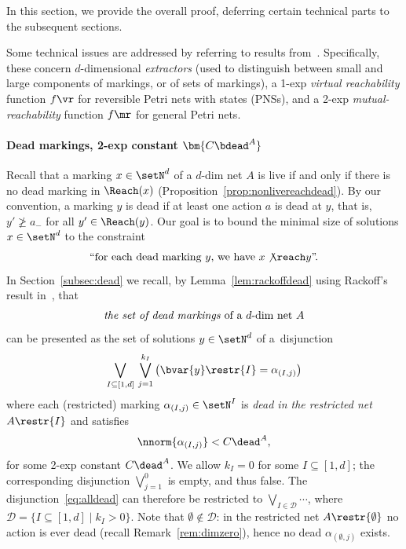 In this section, we provide the overall proof, deferring certain
technical parts 
to the subsequent sections.

\begin{rem}\label{rem:Lerresults}
Some technical issues are addressed by referring to results from~\cite{DBLP:conf/fsttcs/Leroux19}. Specifically, these concern
$d$-dimensional \emph{extractors} (used to distinguish between small
	and large components of markings, or of sets of markings),
a 1-exp \emph{virtual reachability} function $f\vr$ for reversible
	Petri nets with states (PNSs), and 
	a 2-exp \emph{mutual-reachability} function $f\mr$ for general
	Petri nets.
\end{rem}

\paragraph{Dead markings, 2-exp constant $\bm{C\bdead^A}$}
Recall that a marking $x\in\setN^d$ of a $d$-dim net $A$ is live if and only if there is no
dead marking in $\Reach(x)$
(Proposition~\ref{prop:nonlivereachdead}). By our convention, a
marking $y$ is dead if at least one action $a$ is dead at $y$, that
is, $y'\not\geq a_-$ for all $y'\in\Reach(y)$.
Our goal is to bound the minimal size of solutions $x\in\setN^d$ to the constraint
\begin{equation}\label{eq:firstconstr}
	\textnormal{``for each dead marking $y$, we have  $x\not\reach
	y$''.}
\end{equation}
In Section~\ref{subsec:dead} we recall, by
Lemma~\ref{lem:rackoffdead} using  Rackoff's
result in~\cite{DBLP:journals/tcs/Rackoff78}, that 
\begin{equation*}
	\textnormal{\emph{the set of dead markings} of a $d$-dim net
	$A$} 
\end{equation*}
	can be presented
as the set of solutions $y\in\setN^d$ 
of a~disjunction
\begin{equation}\label{eq:alldead}
	\bigvee_{I\subseteq [1,d]} \,\bigvee_{j=1}^{k_I}
	\left(\bvar{y}\restr{I}=\alpha_{(I,j)}\right)
\end{equation}
where 
each (restricted) marking $\alpha_{(I,j)}\in\setN^{I}$ is \emph{dead in the 
restricted net} $A\restr{I}$ and satisfies 
\[\nnorm{\alpha_{(I,j)}}< C\dead^A,\] for some 2-exp
constant $C\dead^A$.
We allow $k_I=0$ for some $I\subseteq [1,d]$; the corresponding
disjunction $\bigvee_{j=1}^{0}$ is empty, and thus false.  The
disjunction~\eqref{eq:alldead} can therefore be restricted to
$\bigvee_{I\in\mathcal{D}}\cdots$, where
$\mathcal{D}=\{I\subseteq[1,d] \mid k_I>0\}$.  
Note that $\emptyset\notin\mathcal{D}$: in the restricted net
$A\restr{\emptyset}$ no action is ever dead (recall
Remark~\ref{rem:dimzero}), hence no dead $\alpha_{(\emptyset,j)}$
exists.


